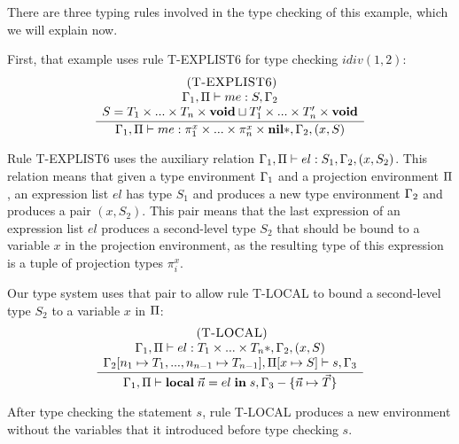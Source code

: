 There are three typing rules involved in the type checking of this example,
which we will explain now.

First, that example uses rule \textsc{T-EXPLIST6} for type checking
$idiv(1, 2)$:
\[
\begin{array}{c}
\; (\textsc{T-EXPLIST6})\\
\dfrac{\begin{array}{c}
       \Gamma_{1}, \Pi \vdash me:S, \Gamma_{2}\\
       S = T_{1} \times ... \times T_{n} \times \mathbf{void} \sqcup T_{1}' \times ... \times T_{n}' \times \mathbf{void}
       \end{array}}
      {\Gamma_{1}, \Pi \vdash me:\pi_{1}^{x} \times ... \times \pi_{n}^{x} \times \mathbf{nil}{*}, \Gamma_{2}, (x,S)}
\end{array}
\]

Rule \textsc{T-EXPLIST6} uses the auxiliary relation
$\Gamma_{1}, \Pi \vdash el : S_{1}, \Gamma_{2}, (x,S_{2})$.
This relation means that given a type environment $\Gamma_{1}$ and
a projection environment $\Pi$, an expression list $el$ has type
$S_{1}$ and produces a new type environment $\Gamma_{2}$ and
produces a pair $(x,S_{2})$.
This pair means that the last expression of an expression list $el$
produces a second-level type $S_{2}$ that should be bound to
a variable $x$ in the projection environment,
as the resulting type of this expression is a tuple of projection
types $\pi_{i}^{x}$.

Our type system uses that pair to allow rule \textsc{T-LOCAL} to bound
a second-level type $S_{2}$ to a variable $x$ in $\Pi$:
\[
\begin{array}{c}
\; (\textsc{T-LOCAL})\\
\dfrac{\begin{array}{c}
       \Gamma_{1}, \Pi \vdash el:T_{1} \times ... \times T_{n}{*}, \Gamma_{2}, (x,S)\\
       \Gamma_{2}[n_{1} \mapsto T_{1}, ..., n_{n-1} \mapsto T_{n-1}], \Pi[x \mapsto S] \vdash s, \Gamma_{3}
       \end{array}}
      {\Gamma_{1}, \Pi \vdash \mathbf{local} \; \vec{n} = el \; \mathbf{in} \; s, \Gamma_{3} - \{\vec{n} \mapsto \vec{T}\}}
\end{array}
\]

After type checking the statement $s$, rule \textsc{T-LOCAL} produces a
new environment without the variables that it introduced before type checking $s$.


